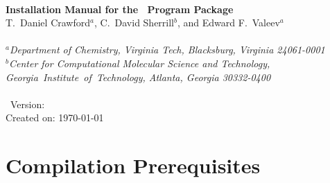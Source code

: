 \documentclass[12pt]{article}
\begin{document}


\begin{center}
\ \\
\vspace{2.0in}
{\bf {\Large Installation Manual for the \PSIfour\ Program Package}} \\
\vspace{0.5in}
T.\ Daniel Crawford$^a$, C.\ David Sherrill$^b$, and
Edward F.\ Valeev$^a$
\\ \  \\
{\em $^a$Department of Chemistry, Virginia Tech, Blacksburg, 
Virginia 24061-0001} \\
\vspace{0.1in}
{\em $^b$Center for Computational Molecular Science and Technology, 
\mbox{Georgia Institute of Technology,} Atlanta, Georgia 30332-0400} \\
\vspace{0.1in}
\ \\
\vspace{0.3in}
\PSIfour\ Version: \PSIversion \\
Created on: \today
\end{center}

\thispagestyle{empty}

\newpage
\section{Compilation Prerequisites}
\end{document}
